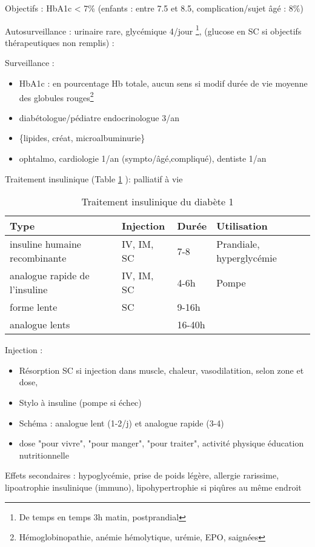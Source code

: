 \documentclass[11pt]{article}
\begin{document}
Objectifs : HbA1c < 7\% (enfants : entre 7.5 et 8.5, complication/sujet âgé : 8\%)

Autosurveillance : urinaire rare, glycémique 4/jour \footnote{De temps en temps 3h matin, postprandial}, (glucose en SC si
objectifs thérapeutiques non remplis) :

Surveillance :
\begin{itemize}
\item HbA1c : en pourcentage Hb totale, aucun sens si modif durée de vie moyenne des globules rouges\footnote{Hémoglobinopathie, anémie hémolytique, urémie, EPO, saignées}
\item diabétologue/pédiatre endocrinologue 3/an
\item \{lipides, créat, microalbuminurie\}
\item ophtalmo, cardiologie 1/an (sympto/âgé,compliqué), dentiste 1/an
\end{itemize}

Traitement insulinique (Table \ref{tab:org8d42369} ): palliatif à vie

\begin{table}[htbp]
\caption{\label{tab:org8d42369}
Traitement insulinique du diabète 1}
\centering
\begin{tabular}{llll}
\toprule
Type & Injection & Durée & Utilisation\\
\midrule
insuline humaine recombinante & IV, IM, SC & 7-8 & Prandiale, hyperglycémie\\
analogue rapide de l'insuline & IV, IM, SC & 4-6h & Pompe\\
forme lente & SC & 9-16h & \\
analogue lents &  & 16-40h & \\
\bottomrule
\end{tabular}
\end{table}

Injection :
\begin{itemize}
\item Résorption SC \inc si injection dans muscle, chaleur, vasodilatition, selon zone et dose,
\item Stylo à insuline (pompe si échec)
\item Schéma : analogue lent (1-2/j) et analogue rapide (3-4)
\item dose "pour vivre", "pour manger", "pour traiter", activité physique \thus
éducation nutritionnelle
\end{itemize}

Effets secondaires : hypoglycémie, prise de poids légère, allergie rarissime,
lipoatrophie insulinique (immuno), lipohypertrophie si piqûres au même endroit
\end{document}
